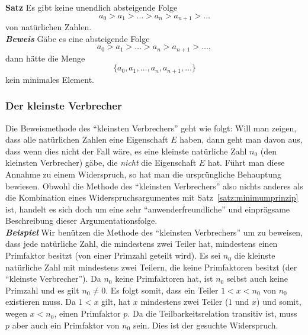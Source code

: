 \textbf{Satz}
Es gibt keine unendlich absteigende Folge
\[
	a_0>a_1>\dots >a_n>a_{n+1}>\dots
\]
von natürlichen Zahlen. \\
\textbf{\textit{Beweis}}
Gäbe es eine absteigende Folge
\[
	a_0>a_1>\dots >a_n>a_{n+1}>\dots,
\]
dann hätte die Menge
\[
	\{
	a_0,a_1,\dots,a_n,a_{n+1},\dots \}
\]
kein minimales Element.

\subsubsection{Der kleinste Verbrecher}
Die Beweismethode des ``kleinsten Verbrechers'' geht wie folgt: Will man zeigen, dass alle natürlichen Zahlen eine Eigenschaft $E$ haben, dann geht man davon aus, dass wenn dies nicht der Fall wäre, es eine kleinste natürliche Zahl $n_0$ (den kleinsten Verbrecher) gäbe, die \textit{nicht} die Eigenschaft $E$ hat. Führt man diese Annahme zu einem Widerspruch, so hat man die ursprüngliche Behauptung bewiesen. Obwohl die Methode des ``kleinsten Verbrechers'' also nichts anderes als die Kombination eines Widerspruchsargumentes mit Satz~\ref{satz:minimumprinzip} ist, handelt es sich doch um eine sehr ``anwenderfreundliche'' und einprägsame Beschreibung dieser Argumentationsfolge.
\\
\textbf{\textit{Beispiel }} Wir benützen die Methode des ``kleinsten Verbrechers'' um zu beweisen, dass jede natürliche Zahl, die mindestens zwei Teiler hat, mindestens einen Primfaktor besitzt (von einer Primzahl geteilt wird).
Es sei $n_0$ die kleinste natürliche Zahl mit mindestens zwei Teilern, die keine Primfaktoren besitzt (der ``kleinste Verbrecher''). Da $n_0$ keine Primfaktoren hat, ist $n_0$ selbst auch keine Primzahl und es gilt $n_0\neq 0$. Es folgt somit, dass ein Teiler $1<x<n_0$ von $n_0$ existieren muss. Da $1<x$ gilt, hat $x$ mindestens zwei Teiler ($1$ und $x$) und somit, wegen $x<n_0$, einen Primfaktor $p$. Da die Teilbarkeitsrelation transitiv ist, muss $p$ aber auch ein Primfaktor von $n_0$ sein. Dies ist der gesuchte Widerspruch.

